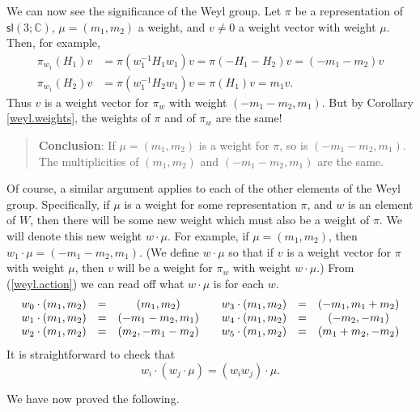\documentclass{amsbook}
\theoremstyle{plain}
\numberwithin{equation}{chapter}
\numberwithin{theorem}{chapter}
\begin{document}
We can now see the significance of the Weyl group. Let $\pi$ be a
representation of $\mathsf{sl}\left(  3;\mathbb{C}\right)  $, $\mu
=(m_{1},m_{2})$ a weight, and $v\neq0$ a weight vector with weight $\mu$.
Then, for example,
\begin{align*}
\pi_{w_{1}}(H_{1})v  & =\pi(w_{1}^{-1}H_{1}w_{1})v=\pi(-H_{1}-H_{2}%
)v=(-m_{1}-m_{2})v\\
\pi_{w_{1}}(H_{2})v  & =\pi(w_{1}^{-1}H_{2}w_{1})v=\pi(H_{1})v=m_{1}v\text{.}%
\end{align*}
Thus $v$ is a weight vector for $\pi_{w}$ with weight $(-m_{1}-m_{2},m_{1})$.
But by Corollary \ref{weyl.weights}, the weights of $\pi$ and of $\pi_{w}$ are
the same!

\begin{quote}
\textbf{Conclusion}: If $\mu=(m_{1},m_{2})$ is a weight for $\pi$, so is
$(-m_{1}-m_{2},m_{1})$. The multiplicities of $(m_{1},m_{2})$ and
$(-m_{1}-m_{2},m_{1})$ are the same.
\end{quote}

Of course, a similar argument applies to each of the other elements of the
Weyl group. Specifically, if $\mu$ is a weight for some representation $\pi$,
and $w$ is an element of $W$, then there will be some new weight which must
also be a weight of $\pi$. We will denote this new weight $w\cdot\mu$. For
example, if $\mu=(m_{1},m_{2})$, then $w_{1}\cdot\mu=(-m_{1}-m_{2},m_{1})$.
(We define $w\cdot\mu$ so that if $v$ is a weight vector for $\pi$ with weight
$\mu$, then $v$ will be a weight for $\pi_{w}$ with weight $w\cdot\mu$.) From
(\ref{weyl.action}) we can read off what $w\cdot\mu$ is for each $w$.
\begin{equation}%
\begin{array}
[c]{ccccccc}%
w_{0}\cdot(m_{1},m_{2}) & = & (m_{1},m_{2}) &  & w_{3}\cdot(m_{1},m_{2}) & = &
(-m_{1},m_{1}+m_{2})\\
w_{1}\cdot(m_{1},m_{2}) & = & (-m_{1}-m_{2},m_{1}) &  & w_{4}\cdot(m_{1}%
,m_{2}) & = & (-m_{2},-m_{1})\\
w_{2}\cdot(m_{1},m_{2}) & = & (m_{2},-m_{1}-m_{2}) &  & w_{5}\cdot(m_{1}%
,m_{2}) & = & (m_{1}+m_{2},-m_{2})
\end{array}
\label{w.act}%
\end{equation}
It is straightforward to check that
\begin{equation}
w_{i}\cdot(w_{j}\cdot\mu)=(w_{i}w_{j})\cdot\mu\text{.}\label{w.group}%
\end{equation}

We have now proved the following.
\end{document}
